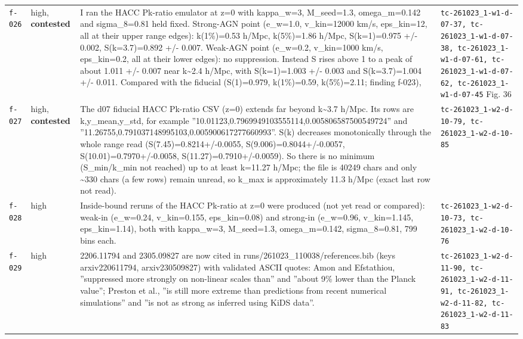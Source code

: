 \documentclass[11pt,a4paper]{article}
\begin{document}
\begin{longtable}{@{}p{}p{}p{}p{}@{}}
\texttt{f-026} & high, \textbf{contested} & I ran the HACC Pk-ratio emulator at z=0 with kappa\_w=3, M\_seed=1.3, omega\_m=0.142 and sigma\_8=0.81 held fixed. Strong-AGN point (e\_w=1.0, v\_kin=12000 km/s, eps\_kin=12, all at their upper range edges): k(1\%)=0.53 h/Mpc, k(5\%)=1.86 h/Mpc, S(k=1)=0.975 +/- 0.002, S(k=3.7)=0.892 +/- 0.007. Weak-AGN point (e\_w=0.2, v\_kin=1000 km/s, eps\_kin=0.2, all at their lower edges): no suppression. Instead S rises above 1 to a peak of about 1.011 +/- 0.007 near k\textasciitilde{}2.4 h/Mpc, with S(k=1)=1.003 +/- 0.003 and S(k=3.7)=1.004 +/- 0.011. Compared with the fiducial (S(1)=0.979, k(1\%)=0.59, k(5\%)=2.11; finding f-023),  & \texttt{tc-261023\_\allowbreak{}1-w1-d-07-37,\allowbreak{} tc-261023\_\allowbreak{}1-w1-d-07-38,\allowbreak{} tc-261023\_\allowbreak{}1-w1-d-07-61,\allowbreak{} tc-261023\_\allowbreak{}1-w1-d-07-62,\allowbreak{} tc-261023\_\allowbreak{}1-w1-d-07-45} Fig. 36 \\
\texttt{f-027} & high, \textbf{contested} & The d07 fiducial HACC Pk-ratio CSV (z=0) extends far beyond k\textasciitilde{}3.7 h/Mpc. Its rows are k,y\_mean,y\_std, for example ''10.01123,0.7969949103555114,0.005806587500549724'' and ''11.26755,0.791037148995103,0.005900617277660993''. S(k) decreases monotonically through the whole range read (S(7.45)=0.8214+/-0.0055, S(9.006)=0.8044+/-0.0057, S(10.01)=0.7970+/-0.0058, S(11.27)=0.7910+/-0.0059). So there is no minimum (S\_min/k\_min not reached) up to at least k=11.27 h/Mpc; the file is 40249 chars and only \textasciitilde{}330 chars (a few rows) remain unread, so k\_max is approximately 11.3 h/Mpc (exact last row not read). & \texttt{tc-261023\_\allowbreak{}1-w2-d-10-79,\allowbreak{} tc-261023\_\allowbreak{}1-w2-d-10-85} \\
\texttt{f-028} & high & Inside-bound reruns of the HACC Pk-ratio at z=0 were produced (not yet read or compared): weak-in (e\_w=0.24, v\_kin=0.155, eps\_kin=0.08) and strong-in (e\_w=0.96, v\_kin=1.145, eps\_kin=1.14), both with kappa\_w=3, M\_seed=1.3, omega\_m=0.142, sigma\_8=0.81, 799 bins each. & \texttt{tc-261023\_\allowbreak{}1-w2-d-10-73,\allowbreak{} tc-261023\_\allowbreak{}1-w2-d-10-76} \\
\texttt{f-029} & high & 2206.11794 and 2305.09827 are now cited in runs/261023\_110038/references.bib (keys arxiv220611794, arxiv230509827) with validated ASCII quotes: Amon and Efstathiou, ''suppressed more strongly on non-linear scales than'' and ''about 9\% lower than the Planck value''; Preston et al., ''is still more extreme than predictions from recent numerical simulations'' and ''is not as strong as inferred using KiDS data''. & \texttt{tc-261023\_\allowbreak{}1-w2-d-11-90,\allowbreak{} tc-261023\_\allowbreak{}1-w2-d-11-91,\allowbreak{} tc-261023\_\allowbreak{}1-w2-d-11-82,\allowbreak{} tc-261023\_\allowbreak{}1-w2-d-11-83} \\

\end{longtable}
\end{document}
